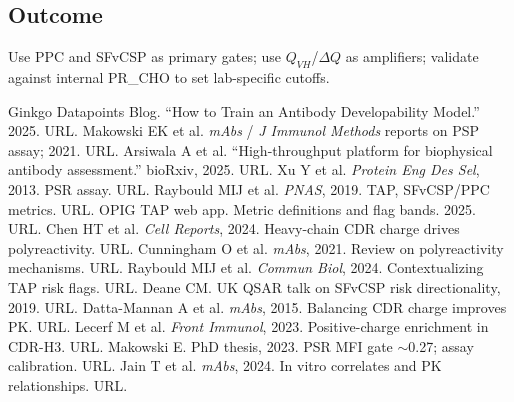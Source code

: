 \subsection*{Outcome}
Use PPC and SFvCSP as primary gates; use $Q_{VH}$/$\Delta Q$ as amplifiers; validate against internal PR\_CHO to set lab-specific cutoffs.

\begin{thebibliography}{99}\footnotesize
{} Ginkgo Datapoints Blog. ``How to Train an Antibody Developability Model.'' 2025. URL.
 Makowski EK et al. \emph{mAbs} / \emph{J Immunol Methods} reports on PSP assay; 2021. URL.
 Arsiwala A et al. ``High-throughput platform for biophysical antibody assessment.'' bioRxiv, 2025. URL.
 Xu Y et al. \emph{Protein Eng Des Sel}, 2013. PSR assay. URL.
 Raybould MIJ et al. \emph{PNAS}, 2019. TAP, SFvCSP/PPC metrics. URL.
 OPIG TAP web app. Metric definitions and flag bands. 2025. URL.
 Chen HT et al. \emph{Cell Reports}, 2024. Heavy-chain CDR charge drives polyreactivity. URL.
 Cunningham O et al. \emph{mAbs}, 2021. Review on polyreactivity mechanisms. URL.
 Raybould MIJ et al. \emph{Commun Biol}, 2024. Contextualizing TAP risk flags. URL.
 Deane CM. UK QSAR talk on SFvCSP risk directionality, 2019. URL.
 Datta-Mannan A et al. \emph{mAbs}, 2015. Balancing CDR charge improves PK. URL.
 Lecerf M et al. \emph{Front Immunol}, 2023. Positive-charge enrichment in CDR-H3. URL.
 Makowski E. PhD thesis, 2023. PSR MFI gate $\sim$0.27; assay calibration. URL.
 Jain T et al. \emph{mAbs}, 2024. In vitro correlates and PK relationships. URL.
\end{thebibliography}
